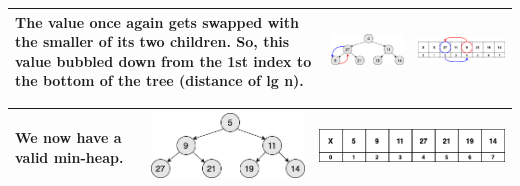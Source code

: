 \begin{center}
	\begin{table}
		\begin{tabular}{| p{}|M{0.30\textwidth}|M{0.35\textwidth}|}
			\hline
			\scriptsize{The value once again gets swapped with the smaller of its two children. So, this value bubbled down from the 1st index to the bottom of the tree (distance of lg n).} 
			  &   
			\includegraphics[scale=.30]{images/heapify_tree_12.png}
			  &   
			\includegraphics[scale=.30]{images/heapify_12.png}\\
			\hline
		\end{tabular}
	\end{table}
\end{center}


\begin{center}
	\begin{table}
		\begin{tabular}{| p{}|M{0.30\textwidth}|M{0.35\textwidth}|}
			\hline
            \scriptsize{We now have a valid min-heap.} 
			  &   
			\includegraphics[scale=.30]{images/heapify_tree_13.png}
			  &   
			\includegraphics[scale=.30]{images/heapify_13.png}\\
			\hline
		\end{tabular}
	\end{table}
\end{center}



